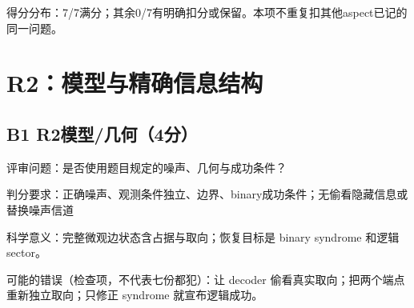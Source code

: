 \documentclass[11pt,a4paper]{article}
\begin{document}
得分分布：7/7满分；其余0/7有明确扣分或保留。本项不重复扣其他aspect已记的同一问题。

\clearpage
\section{R2：模型与精确信息结构}
\subsection{B1 R2模型/几何（4分）}
\label{aspect:B1}
评审问题：是否使用题目规定的噪声、几何与成功条件？

判分要求：正确噪声、观测条件独立、边界、binary成功条件；无偷看隐藏信息或替换噪声信道

科学意义：完整微观边状态含占据与取向；恢复目标是 binary syndrome 和逻辑 sector。

可能的错误（检查项，不代表七份都犯）：让 decoder 偷看真实取向；把两个端点重新独立取向；只修正 syndrome 就宣布逻辑成功。
\end{document}
